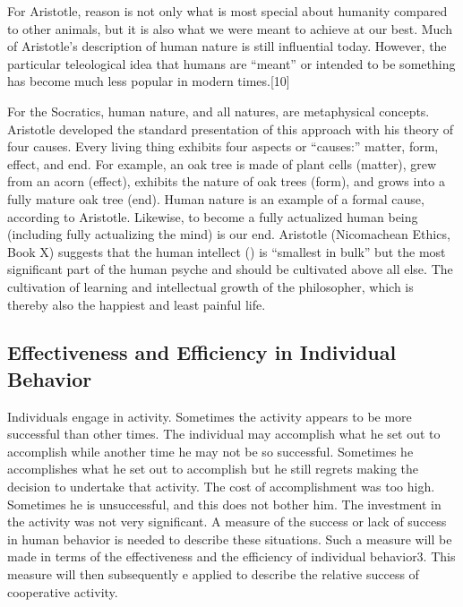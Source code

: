 For Aristotle, reason is not only what is most special about humanity compared to other animals, but it is also what we were meant to achieve at our best. Much of Aristotle's description of human nature is still influential today. However, the particular teleological idea that humans are ``meant'' or intended to be something has become much less popular in modern times.[10]

For the Socratics, human nature, and all natures, are metaphysical concepts. Aristotle developed the standard presentation of this approach with his theory of four causes. Every living thing exhibits four aspects or ``causes:'' matter, form, effect, and end. For example, an oak tree is made of plant cells (matter), grew from an acorn (effect), exhibits the nature of oak trees (form), and grows into a fully mature oak tree (end). Human nature is an example of a formal cause, according to Aristotle. Likewise, to become a fully actualized human being (including fully actualizing the mind) is our end. Aristotle (Nicomachean Ethics, Book X) suggests that the human intellect () is ``smallest in bulk'' but the most significant part of the human psyche and should be cultivated above all else. The cultivation of learning and intellectual growth of the philosopher, which is thereby also the happiest and least painful life.

\subsection{Effectiveness and Efficiency in Individual Behavior}

Individuals engage in activity. Sometimes the activity appears to be more successful than other times. The individual may accomplish what he set out to accomplish while another time he may not be so successful. Sometimes he accomplishes what he set out to accomplish but he still regrets making the decision to undertake that activity. The cost of accomplishment was too high. Sometimes he is unsuccessful, and this does not bother him. The investment in the activity was not very significant. A measure of the success or lack of success in human behavior is needed to describe these situations. Such a measure will be made in terms of the effectiveness and the efficiency of individual behavior3. This measure will then subsequently e applied to describe the relative success of cooperative activity.

